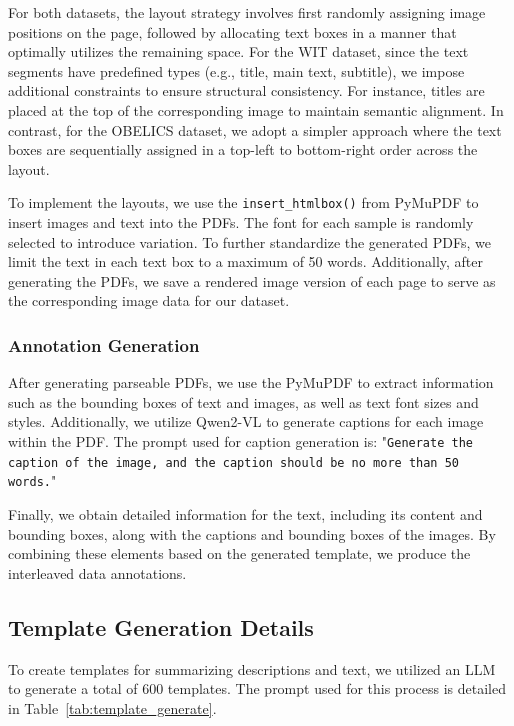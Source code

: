 For both datasets, the layout strategy involves first randomly assigning image positions on the page, followed by allocating text boxes in a manner that optimally utilizes the remaining space. For the WIT dataset, since the text segments have predefined types (e.g., title, main text, subtitle), we impose additional constraints to ensure structural consistency. For instance, titles are placed at the top of the corresponding image to maintain semantic alignment. In contrast, for the OBELICS dataset, we adopt a simpler approach where the text boxes are sequentially assigned in a top-left to bottom-right order across the layout.

To implement the layouts, we use the  \texttt{insert\_htmlbox()}  from PyMuPDF to insert images and text into the PDFs. The font for each sample is randomly selected to introduce variation. To further standardize the generated PDFs, we limit the text in each text box to a maximum of 50 words. Additionally, after generating the PDFs, we save a rendered image version of each page to serve as the corresponding image data for our dataset.


\subsubsection{Annotation Generation}
After generating parseable PDFs, we use the PyMuPDF to extract information such as the bounding boxes of text and images, as well as text font sizes and styles. Additionally, we utilize Qwen2-VL to generate captions for each image within the PDF. The prompt used for caption generation is: "\texttt{Generate the caption of the image, and the caption should be no more than 50 words.}"

Finally, we obtain detailed information for the text, including its content and bounding boxes, along with the captions and bounding boxes of the images. By combining these elements based on the generated template, we produce the interleaved data annotations.

\subsection{Template Generation Details}
\label{sec:appendix_template_details}



To create templates for summarizing descriptions and text, we utilized an LLM to generate a total of 600 templates. The prompt used for this process is detailed in Table~\ref{tab:template_generate}.



